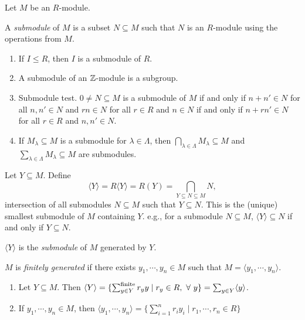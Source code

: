 \noindent Let $M$ be an $R$-module. 

\begin{definition}
    A \emph{submodule} of $M$ is a subset $N \subseteq M$ such that $N$ is an $R$-module using the operations from $M$.
\end{definition}

\begin{example}
    \begin{enumerate}
        \item If $I \leq R$, then $I$ is a submodule of $R$.
        \item A submodule of an $\mathbb{Z}$-module is a subgroup.
        \item Submodule test. $0 \neq N \subseteq M$ is a submodule of $M$ if and only if $n + n' \in N$ for all $n,n' \in N$ and $rn \in N$ for all $r \in R$ and $n \in N$ if and only if $n+rn' \in N$ for all $r \in R$ and $n,n' \in N$.
        \item If $M_\lambda \subseteq M$ is a submodule for $\lambda \in \Lambda$, then $\bigcap_{\lambda \in \Lambda} M_\lambda \subseteq M$ and $\sum_{\lambda \in \Lambda} M_\lambda \subseteq M$ are submodules.
    \end{enumerate}
\end{example}

\begin{definition}
    Let $Y \subseteq M$. Define
    \[\langle Y \rangle = R\langle Y \rangle = R(Y) = \bigcap_{Y \subseteq N \subseteq M}N,\]
    intersection of all submodules $N \subseteq M$ such that $Y \subseteq N$. This is the (unique) smallest submodule of $M$ containing $Y$. e.g., for a submodule $N \subseteq M$, $\langle Y \rangle \subseteq N$ if and only if $Y \subseteq N$. \par
    $\langle Y \rangle$ is the \emph{submodule} of $M$ generated by $Y$. \par 
    $M$ is \emph{finitely generated} if there exists $y_1,\cdots,y_n \in M$ such that $M = \langle y_1,\cdots,y_n \rangle$. 
\end{definition}

\begin{fact}
    \begin{enumerate}
        \item Let $Y \subseteq M$. Then $\langle Y \rangle = \{\sum_{y \in Y}^{\text{finite}} r_yy \mid r_y \in R, \ \forall \  y\} = \sum_{y \in Y} \langle y \rangle$.
        \item If $y_1,\cdots,y_n \in M$, then $\langle y_1,\cdots,y_n \rangle = \{\sum_{i=1}^{n} r_iy_i \mid r_1,\cdots,r_n \in R\}$
    \end{enumerate}
\end{fact}

